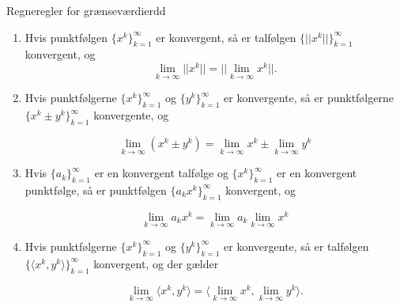 \begin{mytheo}{Regneregler for grænseværdier}{dd}

\begin{enumerate}[label=(\alph*)]
    \item Hvis punktfølgen $\{x^k\}^\infty_{k=1}$ er konvergent, så er talfølgen $\{||x^k||\}^\infty_{k=1}$ konvergent, og 
    \begin{equation}
        \lim_{k \to \infty} ||x^k|| = || \lim_{k \to \infty} x^k||.
    \end{equation}
    
    \item Hvis punktfølgerne $\{x^k\}^\infty_{k=1}$ og $\{y^k\}^\infty_{k=1}$ er konvergente, så er punktfølgerne \\
    $\{x^k \pm y^k\}^\infty_{k=1}$ konvergente, og 
    
    \begin{equation}
        \lim_{k \to \infty} (x^k \pm y^k) =  \lim_{k \to \infty} x^k \pm \lim_{k \to \infty} y^k
    \end{equation}
    
    \item Hvis $\{a_k\}^\infty_{k=1}$ er en konvergent talfølge og $\{x^k\}^\infty_{k=1}$ er en konvergent punktfølge, så er punktfølgen $\{a_kx^k\}^\infty_{k=1}$ konvergent, og 
    
    \begin{equation}
        \lim_{k \to \infty} a_k x^k =  \lim_{k \to \infty} a_k \lim_{k \to \infty} x^k
    \end{equation}
    
    \item Hvis punktfølgerne $\{x^k\}^\infty_{k=1}$ og $\{y^k\}^\infty_{k=1}$ er konvergente, så er talfølgen $\{\langle x^k,y^k\rangle\}^\infty_{k=1}$ konvergent, og der gælder 
    
    \begin{equation}
         \lim_{k \to \infty} \langle x^k,y^k\rangle =   \langle \lim_{k \to \infty} x^k, \lim_{k \to \infty} y^k \rangle.
    \end{equation}
    
\end{enumerate}

\end{mytheo}



